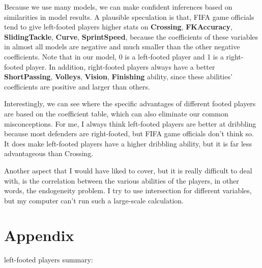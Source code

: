 \documentclass[
]{article}
\begin{document}
Because we use many models, we can make confident inferences based on
similarities in model results. A plausible speculation is that, FIFA
game officials tend to give left-footed players higher stats on
\textbf{Crossing}, \textbf{FKAccuracy}, \textbf{SlidingTackle},
\textbf{Curve}, \textbf{SprintSpeed}, because the coefficients of these
variables in almost all models are negative and much smaller than the
other negative coefficients. Note that in our model, 0 is a left-footed
player and 1 is a right-footed player. In addition, right-footed players
always have a better \textbf{ShortPassing}, \textbf{Volleys},
\textbf{Vision}, \textbf{Finishing} ability, since these abilities'
coefficients are positive and larger than others.

Interestingly, we can see where the specific advantages of different
footed players are based on the coefficient table, which can also
eliminate our common misconceptions. For me, I always think left-footed
players are better at dribbling because most defenders are right-footed,
but FIFA game officials don't think so. It does make left-footed players
have a higher dribbling ability, but it is far less advantageous than
Crossing.

Another aspect that I would have liked to cover, but it is really
difficult to deal with, is the correlation between the various abilities
of the players, in other words, the endogeneity problem. I try to use
intersection for different variables, but my computer can't run such a
large-scale calculation.

\hypertarget{appendix}{%
\section{Appendix}\label{appendix}}

left-footed players summary:
\end{document}
